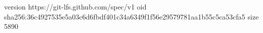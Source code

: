 version https://git-lfs.github.com/spec/v1
oid sha256:36c4927535e5a03c6d6fbdf401c34a6349f1f56e29579781aa1b55c5ca53cfa5
size 5890
